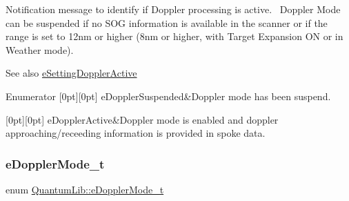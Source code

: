Notification message to identify if Doppler processing is active.~\newline
Doppler Mode can be suspended if no S\+OG information is available in the scanner or if the range is set to 12nm or higher (8nm or higher, with Target Expansion ON or in Weather mode). \begin{DoxySeeAlso}{See also}
\mbox{\hyperlink{namespace_quantum_lib_acc8124e3e65bca4aa798d03a55e3d54ca5c53d22a83382134c9eb12009b61789f}{e\+Setting\+Doppler\+Active}} 
\end{DoxySeeAlso}
\begin{DoxyEnumFields}{Enumerator}
[0pt][0pt]{}\mbox{\label{namespace_quantum_lib_a7a034f49c93f16195096c2ecf89432d4a4cc4676b3d320f718b7eae3d5435a31b}} 
e\+Doppler\+Suspended&Doppler mode has been suspend. \\
\hline

[0pt][0pt]{}\mbox{\label{namespace_quantum_lib_a7a034f49c93f16195096c2ecf89432d4a553ff3bae0c80ed85852ad245ada5c2c}} 
e\+Doppler\+Active&Doppler mode is enabled and doppler approaching/receeding information is provided in spoke data. \\
\hline

\end{DoxyEnumFields}
\mbox{\label{namespace_quantum_lib_a67a865bb9894671b27595a61dfcd44b5}} 
\subsubsection{\texorpdfstring{e\+Doppler\+Mode\+\_\+t}{eDopplerMode\_t}}
{\footnotesize\ttfamily enum \mbox{\hyperlink{namespace_quantum_lib_a67a865bb9894671b27595a61dfcd44b5}{Quantum\+Lib\+::e\+Doppler\+Mode\+\_\+t}}}

